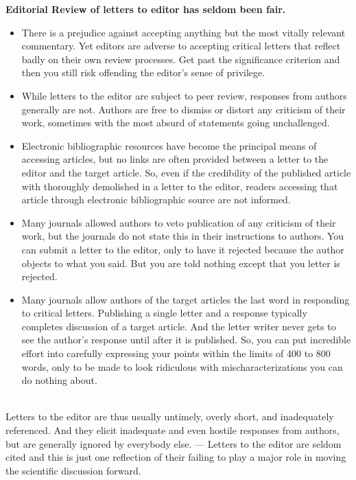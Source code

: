 \documentclass[11pt,twoside,a4paper]{article}
\begin{document}
\textbf{\large Editorial Review of letters to editor has seldom been fair.}
\begin{itemize}
	\item There is a prejudice against accepting anything but the most vitally relevant commentary. Yet editors are adverse to accepting critical letters that reflect badly on their own review processes. Get past the significance criterion and then you still risk offending the editor's sense of privilege.
	\item While letters to the editor are subject to peer review, responses from authors generally are not. Authors are free to dismiss or distort any criticism of their work, sometimes with the most absurd of statements going unchallenged.
	\item Electronic bibliographic resources have become the principal means of accessing articles, but no links are often provided between a letter to the editor and the target article. So, even if the credibility of the published article with thoroughly demolished in a letter to the editor, readers accessing that article through electronic bibliographic source are not informed.
	\item Many journals allowed authors to veto publication of any criticism of their work, but the journals do not state this in their instructions to authors. You can submit a letter to the editor, only to have it rejected because the author objects to what you said. But you are told nothing except that you letter is rejected.
	\item Many journals allow authors of the target articles the last word in responding to critical letters. Publishing a single letter and a response typically completes discussion of a target article. And the letter writer never gets to see the author's response until after it is published. So, you can put incredible effort into carefully expressing your points within the limits of 400 to 800 words, only to be made to look ridiculous with mischaracterizations you can do nothing about.
\end{itemize} ~\\

Letters to the editor are thus usually untimely, overly short, and inadequately referenced. And they elicit inadequate and even hostile responses from authors, but are generally ignored by everybody else. --- Letters to the editor are seldom cited and this is just one reflection of their failing to play a major role in moving the scientific discussion forward. ~\\
\end{document}
